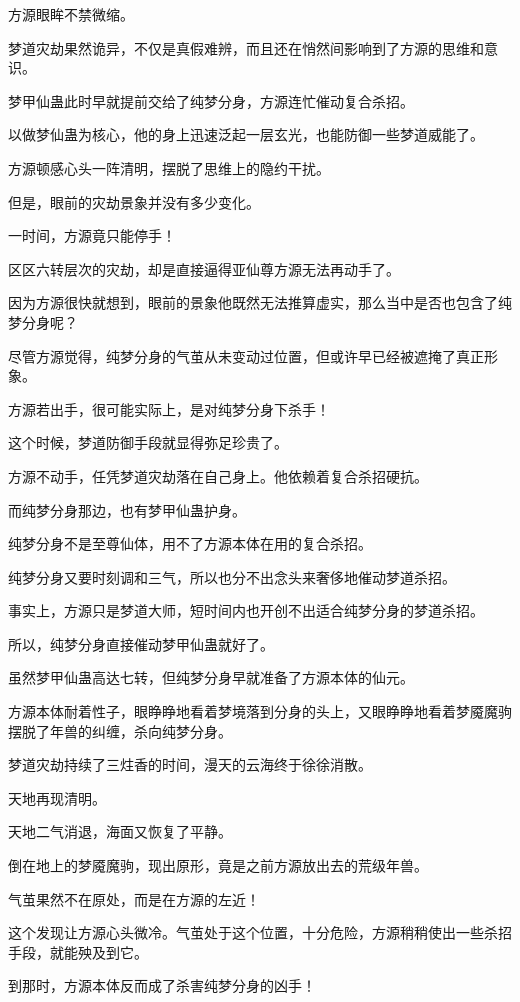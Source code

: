 \begin{this_body}
方源眼眸不禁微缩。

梦道灾劫果然诡异，不仅是真假难辨，而且还在悄然间影响到了方源的思维和意识。

梦甲仙蛊此时早就提前交给了纯梦分身，方源连忙催动复合杀招。

以做梦仙蛊为核心，他的身上迅速泛起一层玄光，也能防御一些梦道威能了。

方源顿感心头一阵清明，摆脱了思维上的隐约干扰。

但是，眼前的灾劫景象并没有多少变化。

一时间，方源竟只能停手！

区区六转层次的灾劫，却是直接逼得亚仙尊方源无法再动手了。

因为方源很快就想到，眼前的景象他既然无法推算虚实，那么当中是否也包含了纯梦分身呢？

尽管方源觉得，纯梦分身的气茧从未变动过位置，但或许早已经被遮掩了真正形象。

方源若出手，很可能实际上，是对纯梦分身下杀手！

这个时候，梦道防御手段就显得弥足珍贵了。

方源不动手，任凭梦道灾劫落在自己身上。他依赖着复合杀招硬抗。

而纯梦分身那边，也有梦甲仙蛊护身。

纯梦分身不是至尊仙体，用不了方源本体在用的复合杀招。

纯梦分身又要时刻调和三气，所以也分不出念头来奢侈地催动梦道杀招。

事实上，方源只是梦道大师，短时间内也开创不出适合纯梦分身的梦道杀招。

所以，纯梦分身直接催动梦甲仙蛊就好了。

虽然梦甲仙蛊高达七转，但纯梦分身早就准备了方源本体的仙元。

方源本体耐着性子，眼睁睁地看着梦境落到分身的头上，又眼睁睁地看着梦魇魔驹摆脱了年兽的纠缠，杀向纯梦分身。

梦道灾劫持续了三炷香的时间，漫天的云海终于徐徐消散。

天地再现清明。

天地二气消退，海面又恢复了平静。

倒在地上的梦魇魔驹，现出原形，竟是之前方源放出去的荒级年兽。

气茧果然不在原处，而是在方源的左近！

这个发现让方源心头微冷。气茧处于这个位置，十分危险，方源稍稍使出一些杀招手段，就能殃及到它。

到那时，方源本体反而成了杀害纯梦分身的凶手！


\end{this_body}
